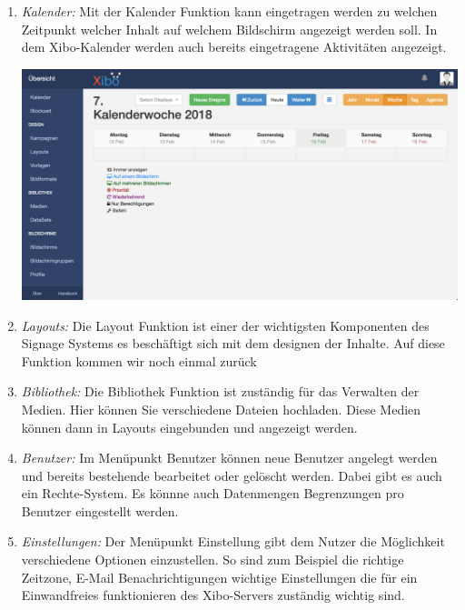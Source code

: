\begin{enumerate}
	\item {\em Kalender:} Mit der Kalender Funktion kann eingetragen werden zu welchen Zeitpunkt welcher Inhalt auf welchem Bildschirm angezeigt werden soll. In dem Xibo-Kalender werden auch bereits eingetragene Aktivitäten angezeigt.

\begin{calendar}
	\centering
\includegraphics[width=1\textwidth]{images/xibo-basics-calendar}
	\label{Calendar}
\end{calendar}	
	
	\item {\em Layouts:} 
	Die Layout Funktion ist einer der wichtigsten Komponenten des Signage Systems es beschäftigt sich mit dem designen der Inhalte. Auf diese Funktion kommen wir noch einmal zurück
	
	\item {\em Bibliothek:} 
	Die Bibliothek Funktion ist zuständig für das Verwalten der Medien. Hier können Sie verschiedene Dateien hochladen.  Diese Medien können dann in Layouts eingebunden und angezeigt werden.
	
	\item {\em Benutzer:} 
	Im Menüpunkt Benutzer können neue Benutzer angelegt werden und bereits bestehende bearbeitet oder gelöscht werden. Dabei gibt es auch ein Rechte-System. Es könnne auch Datenmengen Begrenzungen pro Benutzer eingestellt werden.
	
	\item {\em Einstellungen:} 
	Der Menüpunkt Einstellung gibt dem Nutzer die Möglichkeit verschiedene Optionen einzustellen. So sind zum Beispiel die richtige Zeitzone, E-Mail Benachrichtigungen wichtige Einstellungen die für ein Einwandfreies funktionieren des Xibo-Servers zuständig wichtig sind.
\end{enumerate}


